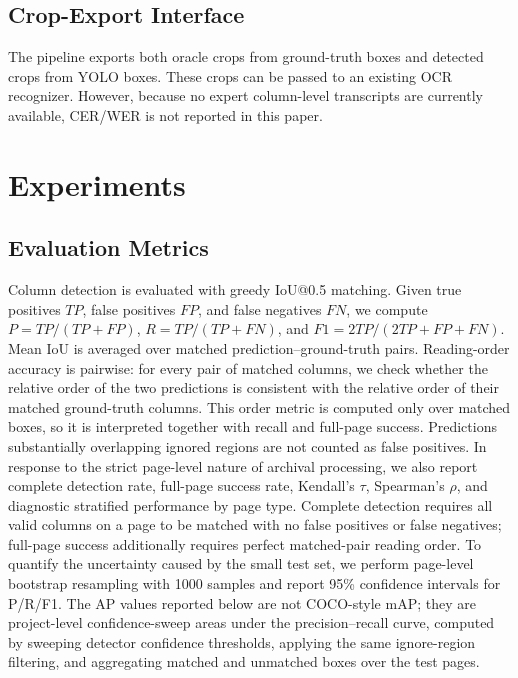 \documentclass[pdflatex,sn-mathphys-num]{sn-jnl}
\begin{document}
\subsection{Crop-Export Interface}
The pipeline exports both oracle crops from ground-truth boxes and detected crops from YOLO boxes. These crops can be passed to an existing OCR recognizer. However, because no expert column-level transcripts are currently available, CER/WER is not reported in this paper.

\section{Experiments}
\subsection{Evaluation Metrics}
Column detection is evaluated with greedy IoU@0.5 matching. Given true positives $TP$, false positives $FP$, and false negatives $FN$, we compute $P=TP/(TP+FP)$, $R=TP/(TP+FN)$, and $F1=2TP/(2TP+FP+FN)$. Mean IoU is averaged over matched prediction--ground-truth pairs. Reading-order accuracy is pairwise: for every pair of matched columns, we check whether the relative order of the two predictions is consistent with the relative order of their matched ground-truth columns. This order metric is computed only over matched boxes, so it is interpreted together with recall and full-page success. Predictions substantially overlapping ignored regions are not counted as false positives. In response to the strict page-level nature of archival processing, we also report complete detection rate, full-page success rate, Kendall's $\tau$, Spearman's $\rho$, and diagnostic stratified performance by page type. Complete detection requires all valid columns on a page to be matched with no false positives or false negatives; full-page success additionally requires perfect matched-pair reading order. To quantify the uncertainty caused by the small test set, we perform page-level bootstrap resampling with 1000 samples and report 95\% confidence intervals for P/R/F1. The AP values reported below are not COCO-style mAP; they are project-level confidence-sweep areas under the precision--recall curve, computed by sweeping detector confidence thresholds, applying the same ignore-region filtering, and aggregating matched and unmatched boxes over the test pages.
\end{document}
